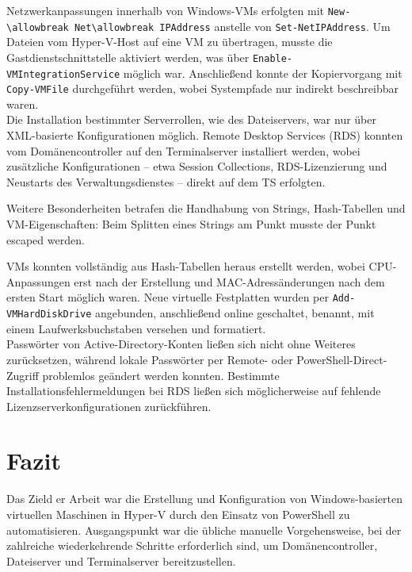 \documentclass[a4paper,12pt]{article}
\begin{document}
Netzwerkanpassungen innerhalb von Windows-VMs erfolgten mit \lstinline|New-\allowbreak Net\allowbreak IPAddress| anstelle von \lstinline|Set-NetIPAddress|. Um Dateien vom Hyper-V-Host auf eine VM zu übertragen, musste die Gastdienstschnittstelle aktiviert werden, was über \lstinline|Enable-VMIntegrationService| möglich war. Anschließend konnte der Kopiervorgang mit \lstinline|Copy-VMFile| durchgeführt werden, wobei Systempfade nur indirekt beschreibbar waren.\\  

Die Installation bestimmter Serverrollen, wie des Dateiservers, war nur über XML-basierte Konfigurationen möglich. Remote Desktop Services (RDS) konnten vom Domänencontroller auf den Terminalserver installiert werden, wobei zusätzliche Konfigurationen -- etwa Session Collections, RDS-Lizenzierung und Neustarts des Verwaltungsdienstes -- direkt auf dem TS erfolgten.  

Weitere Besonderheiten betrafen die Handhabung von Strings, Hash-Tabellen und VM-Eigenschaften: Beim Splitten eines Strings am Punkt musste der Punkt escaped werden. 

VMs konnten vollständig aus Hash-Tabellen heraus erstellt werden, wobei CPU-Anpassungen erst nach der Erstellung und MAC-Adressänderungen nach dem ersten Start möglich waren. Neue virtuelle Festplatten wurden per \lstinline|Add-VMHardDiskDrive| angebunden, anschließend online geschaltet, benannt, mit einem Laufwerksbuchstaben versehen und formatiert. \\

Passwörter von Active-Directory-Konten ließen sich nicht ohne Weiteres zurücksetzen, während lokale Passwörter per Remote- oder PowerShell-Direct-Zugriff problemlos geändert werden konnten. Bestimmte Installationsfehlermeldungen bei RDS ließen sich möglicherweise auf fehlende Lizenzserverkonfigurationen zurückführen.\\

\newpage

\section{Fazit}

Das Zield er Arbeit war die Erstellung und Konfiguration von Windows-basierten virtuellen Maschinen in Hyper-V durch den Einsatz von PowerShell zu automatisieren.
Ausgangspunkt war die übliche manuelle Vorgehensweise, bei der zahlreiche wiederkehrende Schritte erforderlich sind, um Domänencontroller, Dateiserver und Terminalserver bereitzustellen.\\
\end{document}

